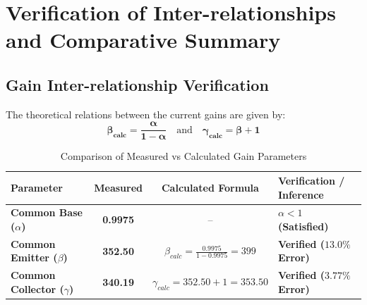 \documentclass[11pt,a4paper]{article}
\begin{document}
\section{Verification of Inter-relationships and Comparative Summary}
\subsection{Gain Inter-relationship Verification}
The theoretical relations between the current gains are given by:
\begin{equation}
    \mathbf{\beta_{calc} = \frac{\alpha}{1 - \alpha}} \quad \text{and} \quad \mathbf{\gamma_{calc} = \beta + 1}
\end{equation}
\begin{table}[H]
\centering
\caption{Comparison of Measured vs Calculated Gain Parameters}
\begin{tabular}{p{4.0cm} c c p{4.0cm}}
\toprule
\textbf{Parameter} & \textbf{Measured} & \textbf{Calculated Formula} & \textbf{Verification / Inference} \\
\midrule
\textbf{Common Base ($\alpha$)} & \textbf{0.9975} & -- & \textbf{$\alpha < 1$ (Satisfied)} \\
\textbf{Common Emitter ($\beta$)} & \textbf{352.50} & \textbf{$\beta_{calc} = \frac{0.9975}{1 - 0.9975} = 399$} & \textbf{Verified ($13.0\%$ Error)} \\
\textbf{Common Collector ($\gamma$)} & \textbf{340.19} & \textbf{$\gamma_{calc} = 352.50 + 1 = 353.50$} & \textbf{Verified ($3.77\%$ Error)} \\
\bottomrule
\end{tabular}
\end{table}
\end{document}
